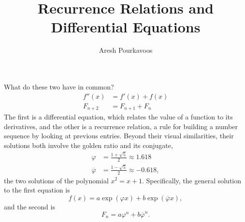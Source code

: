 \documentclass{article}
\begin{document}
\title{Recurrence Relations and Differential Equations}
\author{Aresh Pourkavoos}
\maketitle

What do these two have in common?
\begin{align*}
  f''(x) &= f'(x)+f(x) \\
  F_{n+2} &= F_{n+1}+F_n
\end{align*}
The first is a differential equation,
which relates the value of a function to its derivatives,
and the other is a recurrence relation,
a rule for building a number sequence by looking at previous entries.
Beyond their visual similarities,
their solutions both involve the golden ratio and its conjugate,
\begin{align*}
  \varphi &= \frac{1+\sqrt{5}}{2} \approx 1.618 \\
  \overline{\varphi} &= \frac{1-\sqrt{5}}{2} \approx -0.618,
\end{align*}
the two solutions of the polynomial
$x^2=x+1$.
Specifically, the general solution to the first equation is
\[f(x) = a\exp(\varphi x)+b\exp(\overline{\varphi}x),\]
and the second is
\[F_n = a\varphi^n+b\overline{\varphi}^n.\]



\end{document}
